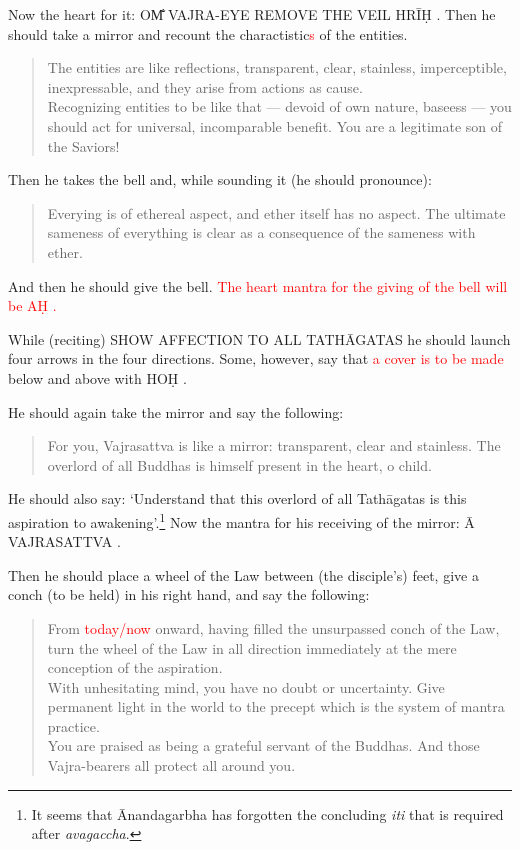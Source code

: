 \documentclass[11pt]{book}
\makeatletter
\def\fakesc#1{%
  \begingroup%
  \xdef\fake@name{\csname\curr@fontshape/\f@size\endcsname}%
  \fontsize{1.3\fontdimen8\fake@name}{\baselineskip}\selectfont%
  \uppercase{#1}%
  \endgroup%
}
\newcommand{\mantra}[1]{\fakesc{#1}}
\newcommand{\red}[1]{\textcolor{red}{#1}}
\newcommand{\skt}[1]{\emph{#1}}
\makeatother
\begin{document}
Now the heart for it: \mantra{om̐ vajra-eye remove the veil hrīḥ}. Then he should take a mirror and recount the charactistic\red{s} of the entities.

\begin{verse}
The entities are like reflections, transparent, clear, stainless, imperceptible, inexpressable, and they arise from actions as cause.\\
Recognizing entities to be like that — devoid of own nature, baseess — you should act for universal, incomparable benefit. You are a legitimate son of the Saviors!
\end{verse}

Then he takes the bell and, while sounding it (he should pronounce):

\begin{verse}
Everying is of ethereal aspect, and ether itself has no aspect. The ultimate sameness of everything is clear as a consequence of the sameness with ether.
\end{verse}

And then he should give the bell. \red{The heart mantra for the giving of the bell will be \mantra{aḥ}.}

While (reciting) \mantra{show affection to all Tathāgatas} he should launch four arrows in the four directions. Some, however, say that \red{a cover is to be made} below and above with \mantra{hoḥ}.

He should again take the mirror and say the following:

\begin{verse}
For you, Vajrasattva is like a mirror: transparent, clear and stainless. The overlord of all Buddhas is himself present in the heart, o child.
\end{verse}

He should also say: `Understand that this overlord of all Tathāgatas is this aspiration to awakening'.\footnote{It seems that Ānandagarbha has forgotten the concluding \skt{iti} that is required after \skt{avagaccha}.} Now the mantra for his receiving of the mirror: \mantra{ā vajrasattva}.

Then he should place a wheel of the Law between (the disciple's) feet, give a conch (to be held) in his right hand, and say the following:

\begin{verse}
From \red{today/now} onward, having filled the unsurpassed conch of the Law, turn the wheel of the Law in all direction immediately at the mere conception of the aspiration.\\
With unhesitating mind, you have no doubt or uncertainty. Give permanent light in the world to the precept which is the system of mantra practice.\\
You are praised as being a grateful servant of the Buddhas. And those Vajra-bearers all protect all around you.
\end{verse}
\end{document}
